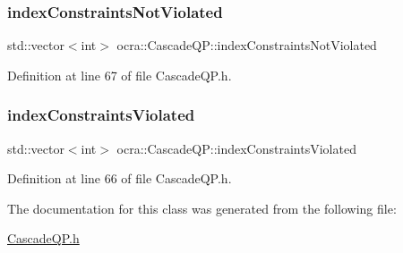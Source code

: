 \hypertarget{classocra_1_1CascadeQP_aff033d8c8c8804f1105d461e0ef7ed12}{}\label{classocra_1_1CascadeQP_aff033d8c8c8804f1105d461e0ef7ed12} 
\subsubsection{\texorpdfstring{index\+Constraints\+Not\+Violated}{indexConstraintsNotViolated}}
{\footnotesize\ttfamily std\+::vector$<$int$>$ ocra\+::\+Cascade\+Q\+P\+::index\+Constraints\+Not\+Violated\hspace{0.3cm}{\ttfamily [protected]}}



Definition at line 67 of file Cascade\+Q\+P.\+h.

\hypertarget{classocra_1_1CascadeQP_a7f6949ea468c0b2536fd97b8e1eb262f}{}\label{classocra_1_1CascadeQP_a7f6949ea468c0b2536fd97b8e1eb262f} 
\subsubsection{\texorpdfstring{index\+Constraints\+Violated}{indexConstraintsViolated}}
{\footnotesize\ttfamily std\+::vector$<$int$>$ ocra\+::\+Cascade\+Q\+P\+::index\+Constraints\+Violated\hspace{0.3cm}{\ttfamily [protected]}}



Definition at line 66 of file Cascade\+Q\+P.\+h.



The documentation for this class was generated from the following file\+:\begin{DoxyCompactItemize}
\item 
\hyperlink{CascadeQP_8h}{Cascade\+Q\+P.\+h}\end{DoxyCompactItemize}
